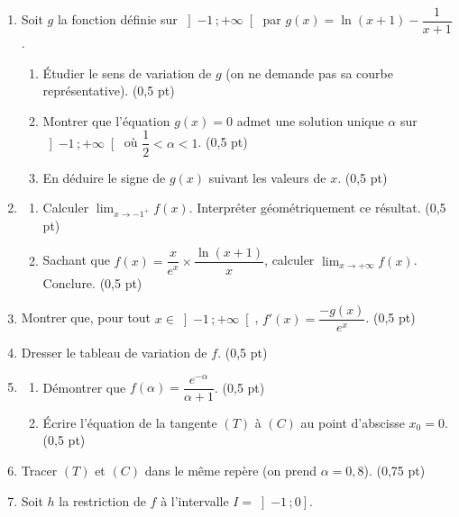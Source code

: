 \begin{enumerate}[label=\textbf{\arabic*.}, leftmargin=*, itemsep=0.3em]
  \item Soit $g$ la fonction définie sur $\left]-1\,;+\infty\right[$ par
        $g(x) = \ln(x+1) - \dfrac{1}{x+1}$.
        \begin{enumerate}[label=\textbf{\alph*)}, leftmargin=1.4em]
          \item Étudier le sens de variation de $g$ (on ne demande pas sa
                courbe représentative). \hfill\textup{(0,5 pt)}
          \item Montrer que l'équation $g(x) = 0$ admet une solution unique
                $\alpha$ sur $\left]-1\,;+\infty\right[$ où
                $\dfrac12 < \alpha < 1$. \hfill\textup{(0,5 pt)}
          \item En déduire le signe de $g(x)$ suivant les valeurs de $x$.
                \hfill\textup{(0,5 pt)}
        \end{enumerate}
  \item \begin{enumerate}[label=\textbf{\alph*)}, leftmargin=1.4em]
          \item Calculer $\lim_{x\to-1^{+}}f(x)$. Interpréter géométriquement
                ce résultat. \hfill\textup{(0,5 pt)}
          \item Sachant que $f(x) = \dfrac{x}{e^{x}}\times\dfrac{\ln(x+1)}{x}$,
                calculer $\lim_{x\to+\infty}f(x)$. Conclure.
                \hfill\textup{(0,5 pt)}
        \end{enumerate}
  \item Montrer que, pour tout $x \in \left]-1\,;+\infty\right[$,
        $f'(x) = \dfrac{-g(x)}{e^{x}}$. \hfill\textup{(0,5 pt)}
  \item Dresser le tableau de variation de $f$. \hfill\textup{(0,5 pt)}
  \item \begin{enumerate}[label=\textbf{\alph*)}, leftmargin=1.4em]
          \item Démontrer que $f(\alpha) = \dfrac{e^{-\alpha}}{\alpha+1}$.
                \hfill\textup{(0,5 pt)}
          \item Écrire l'équation de la tangente $(T)$ à $(C)$ au point
                d'abscisse $x_{0} = 0$. \hfill\textup{(0,5 pt)}
        \end{enumerate}
  \item Tracer $(T)$ et $(C)$ dans le même repère (on prend
        $\alpha = 0{,}8$). \hfill\textup{(0,75 pt)}
  \item Soit $h$ la restriction de $f$ à l'intervalle $I = \left]-1\,;0\right]$.

\end{enumerate}
